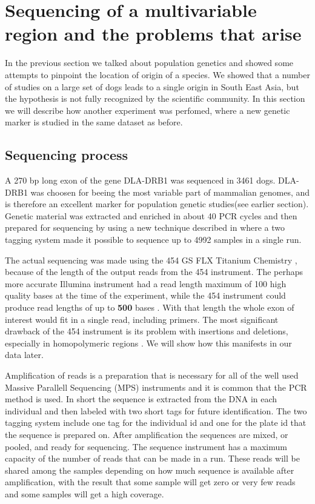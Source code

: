 \documentclass[a4paper,11pt]{kth-mag}
\begin{document}
\chapter{Sequencing of a multivariable region and the problems that arise}

In the previous section we talked about population genetics and showed some attempts to pinpoint the location of origin of a species. We showed that a number of studies on a large set of dogs leads to a single origin in South East Asia, but the hypothesis is not fully recognized by the scientific community. In this section we will describe how another experiment was perfomed, where a new genetic marker is studied in the same dataset as before.

\section{Sequencing process}

A 270 bp long exon of the gene DLA-DRB1 was sequenced in 3461 dogs. DLA-DRB1 was choosen for beeing the most variable part of mammalian genomes, and is therefore an excellent marker for population genetic studies(see earlier section). Genetic material was extracted and enriched in about 40 PCR cycles and then prepared for sequencing by using a new technique described in \cite{neiman11} where a two tagging system made it possible to sequence up to 4992 samples in a single run. 

The actual sequencing was made using the 454 GS FLX Titanium Chemistry \cite{454_tech}, because of the length of the output reads from the 454 instrument. The perhaps more accurate Illumina instrument had a read length maximum of 100 high quality bases \cite{NextGen} at the time of the experiment, while the 454 instrument could produce read lengths of up to \textbf{500} bases \cite{454_problems}. With that length the whole exon of interest would fit in a single read, including primers. The most significant drawback of the 454 instrument is its problem with insertions and deletions, especially in homopolymeric regions \cite{454_problems}. We will show how this manifests in our data later.

Amplification of reads is a preparation that is necessary for all of the well used Massive Parallell Sequencing ({MPS}) instruments \cite{NextGen} and it is common that the {PCR} method \cite{pcr} is used. In short the sequence is extracted from the {DNA} in each individual and then labeled with two short tags for future identification. The two tagging system include one tag for the individual id and one for the plate id that the sequence is prepared on. After amplification the sequences are mixed, or pooled, and ready for sequencing. The sequence instrument has a maximum capacity of the number of reads that can be made in a run. These reads will be shared among the samples depending on how much sequence is available after amplification, with the result that some sample will get zero or very few reads and some samples will get a high coverage.
\end{document}
